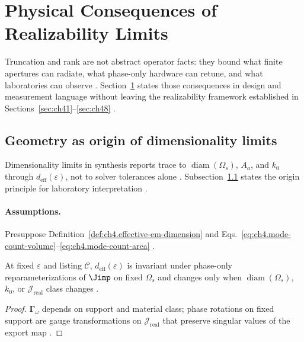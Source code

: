 \section{Physical Consequences of Realizability Limits}
\label{sec:ch49}

Truncation and rank are not abstract operator facts: they bound what finite apertures can radiate, what phase-only hardware can retune,
and what laboratories can observe \cite{stratton1941,harrington2001,devaney2004}. Section~\ref{sec:ch49} states those consequences in
design and measurement language without leaving the realizability framework established in Sections~\ref{sec:ch41}--\ref{sec:ch48}
\cite{hansen1988,jackson1999}.


\subsection{Geometry as origin of dimensionality limits}
\label{sec:ch491}

Dimensionality limits in synthesis reports trace to \(\operatorname{diam}(\Omega_{s})\), \(A_{a}\), and \(k_{0}\) through
\(d_{\mathrm{eff}}(\varepsilon)\), not to solver tolerances alone \cite{stratton1941,jackson1999,hansen1988}. Subsection~\ref{sec:ch491}
states the origin principle for laboratory interpretation \cite{harrington2001,devaney2004}.

\paragraph{Assumptions.}
Presuppose Definition~\ref{def:ch4.effective-em-dimension} and Eqs.~\eqref{eq:ch4.mode-count-volume}--\eqref{eq:ch4.mode-count-area}
\cite{stratton1941,hansen1988,harrington2001}.

\begin{theorem}
\label{thm:ch4.geometry-rank-origin}
At fixed \(\varepsilon\) and listing \(\mathcal{C}\), \(d_{\mathrm{eff}}(\varepsilon)\) is invariant under phase-only
reparameterizations of \(\Jimp\) on fixed \(\Omega_{s}\) and changes only when \(\operatorname{diam}(\Omega_{s})\), \(k_{0}\), or
\(\mathcal{J}_{\mathrm{real}}\) class changes \cite{stratton1941,jackson1999,hansen1988,harrington2001,devaney2004}.
\end{theorem}
\begin{proof}
\(\boldsymbol{\Gamma}_\omega\) depends on support and material class; phase rotations on fixed support are gauge transformations on
\(\mathcal{J}_{\mathrm{real}}\) that preserve singular values of the export map \cite{harrington2001,stratton1941}.
\end{proof}

